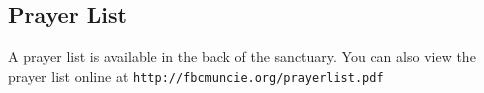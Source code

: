 \vfill

\subsection{Prayer List}
\label{prayerlist}

A prayer list is available in the back of the sanctuary. You can also view the prayer list online at  \texttt{http://fbcmuncie.org/prayerlist.pdf} 

 \vfill 